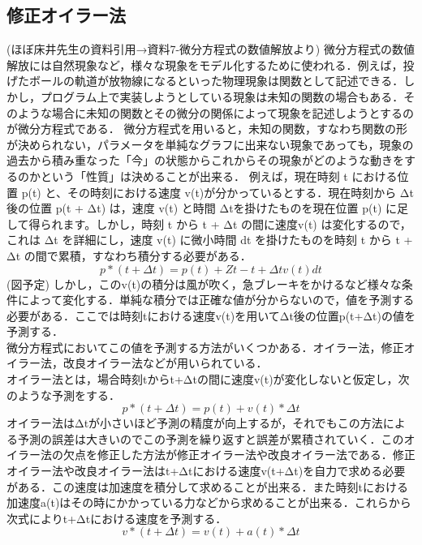 \documentclass[11pt]{jreport}
\begin{document}
\subsection{修正オイラー法}
 (ほぼ床井先生の資料引用→資料7-微分方程式の数値解放より)
 微分方程式の数値解放には自然現象など，様々な現象をモデル化するために使われる．例えば，投げたボールの軌道が放物線になるといった物理現象は関数として記述できる．しかし，プログラム上で実装しようとしている現象は未知の関数の場合もある．そのような場合に未知の関数とその微分の関係によって現象を記述しようとするのが微分方程式である．
 微分方程式を用いると，未知の関数，すなわち関数の形が決められない，パラメータを単純なグラフに出来ない現象であっても，現象の過去から積み重なった「今」の状態からこれからその現象がどのような動きをするのかという「性質」は決めることが出来る．
 例えば，現在時刻 t における位置 p(t) と、その時刻における速度 v(t)が分かっているとする．現在時刻から Δt 後の位置 p(t + Δt) は，速度 v(t) と時間 Δtを掛けたものを現在位置 p(t) に足して得られます。しかし，時刻 t から t + Δt の間に速度v(t) は変化するので，これは Δt を詳細にし，速度 v(t) に微小時間 dt を掛けたものを時刻 t から t + Δt の間で累積，すなわち積分する必要がある．
\begin{equation}
  p*(t + Δt) = p(t) + Z t-t+Δt v(t)dt \label{exp:sample}
\end{equation}
(図予定)
 しかし，このv(t)の積分は風が吹く，急ブレーキをかけるなど様々な条件によって変化する．単純な積分では正確な値が分からないので，値を予測する必要がある．ここでは時刻tにおける速度v(t)を用いてΔt後の位置p(t+Δt)の値を予測する．\\
微分方程式においてこの値を予測する方法がいくつかある．オイラー法，修正オイラー法，改良オイラー法などが用いられている．\\
オイラー法とは，場合時刻tからt+Δtの間に速度v(t)が変化しないと仮定し，次のような予測をする．
\begin{equation}
  p*(t + Δt) = p(t) + v(t)*Δt \label{exp:sample}
\end{equation}
オイラー法はΔtが小さいほど予測の精度が向上するが，それでもこの方法による予測の誤差は大きいのでこの予測を繰り返すと誤差が累積されていく．このオイラー法の欠点を修正した方法が修正オイラー法や改良オイラー法である．修正オイラー法や改良オイラー法はt+Δtにおける速度v(t+Δt)を自力で求める必要がある．この速度は加速度を積分して求めることが出来る．また時刻tにおける加速度a(t)はその時にかかっている力などから求めることが出来る．これらから次式によりt+Δtにおける速度を予測する．
\begin{equation}
  v*(t + Δt) = v(t) + a(t)*Δt \label{exp:sample}
\end{equation}
\end{document}
